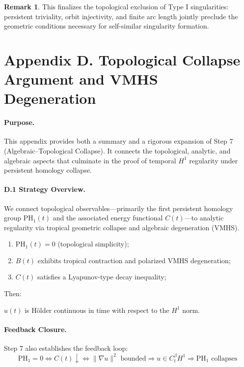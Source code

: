\documentclass[11pt]{article}
\theoremstyle{definition}
\newtheorem{remark}[theorem]{Remark}
\begin{document}
\begin{remark}
This finalizes the topological exclusion of Type I singularities: persistent triviality, orbit injectivity, and finite arc length jointly preclude the geometric conditions necessary for self-similar singularity formation.
\end{remark}


\section*{Appendix D. Topological Collapse Argument and VMHS Degeneration}

\paragraph{Purpose.}
This appendix provides both a summary and a rigorous expansion of Step 7 (Algebraic–Topological Collapse). It connects the topological, analytic, and algebraic aspects that culminate in the proof of temporal $H^1$ regularity under persistent homology collapse.

\paragraph{D.1 Strategy Overview.}
We connect topological observables—primarily the first persistent homology group $\mathrm{PH}_1(t)$ and the associated energy functional $C(t)$—to analytic regularity via tropical geometric collapse and algebraic degeneration (VMHS).

\begin{enumerate}
  \item $\mathrm{PH}_1(t) = 0$ (topological simplicity);
  \item $B(t)$ exhibits tropical contraction and polarized VMHS degeneration;
  \item $C(t)$ satisfies a Lyapunov-type decay inequality;
\end{enumerate}

Then:
\begin{center}
$u(t)$ is Hölder continuous in time with respect to the $H^1$ norm.
\end{center}

\paragraph{Feedback Closure.}
Step 7 also establishes the feedback loop:
\[
\mathrm{PH}_1 = 0 \Leftrightarrow C(t) \downarrow \Leftrightarrow \|\nabla u\|^2 \text{ bounded} \Rightarrow u \in C^{\beta}_t H^1 \Rightarrow \mathrm{PH}_1 \text{ collapses}
\]
\end{document}
